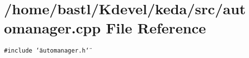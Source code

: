 \section{/home/bastl/Kdevel/keda/src/automanager.cpp File Reference}
\label{automanager_8cpp}
{\tt \#include \char`\"{}automanager.h\char`\"{}}\par
